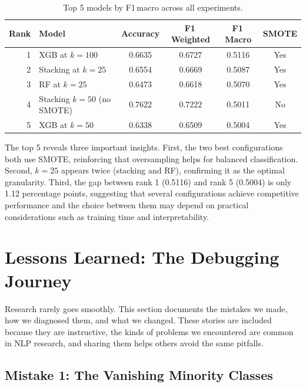 \documentclass[12pt,a4paper,twoside]{article}
\theoremstyle{definition}
\begin{document}
\begin{table}[h]
\centering
\caption{Top 5 models by F1\,macro across all experiments.}
\label{tab:top5}
\begin{tabular}{rlcccc}
\toprule
\textbf{Rank} & \textbf{Model} & \textbf{Accuracy} & \textbf{F1\,Weighted} & \textbf{F1\,Macro} & \textbf{SMOTE} \\
\midrule
1 & XGB at $k=100$ & 0.6635 & 0.6727 & 0.5116 & Yes \\
2 & Stacking at $k=25$ & 0.6554 & 0.6669 & 0.5087 & Yes \\
3 & RF at $k=25$ & 0.6473 & 0.6618 & 0.5070 & Yes \\
4 & Stacking $k=50$ (no SMOTE) & 0.7622 & 0.7222 & 0.5011 & No \\
5 & XGB at $k=50$ & 0.6338 & 0.6509 & 0.5004 & Yes \\
\bottomrule
\end{tabular}
\end{table}
 
The top 5 reveals three important insights. First, the two best configurations both use SMOTE, reinforcing that oversampling helps for balanced classification. Second, $k=25$ appears twice (stacking and RF), confirming it as the optimal granularity. Third, the gap between rank 1 (0.5116) and rank 5 (0.5004) is only 1.12 percentage points, suggesting that several configurations achieve competitive performance and the choice between them may depend on practical considerations such as training time and interpretability.





\section{Lessons Learned: The Debugging Journey}
\label{sec:debugging}

Research rarely goes smoothly. This section documents the mistakes we made, how we diagnosed them, and what we changed. These stories are included because they are instructive, the kinds of problems we encountered are common in NLP research, and sharing them helps others avoid the same pitfalls.

\subsection{Mistake 1: The Vanishing Minority Classes}
\end{document}
